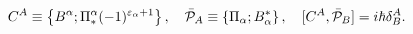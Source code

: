 \begin{equation}
C^{A}\equiv\left\{  B^{\alpha};\Pi_{\ast}^{\alpha}
(-1)^{\varepsilon_{\alpha}+1}\right\},\quad
\bar{{\cal P}}_{A}\equiv\left\{\Pi_{\alpha};B_{\alpha}^{\ast}\right\},\quad
[C^{A},\bar{{\cal P}}_{B}]=i\hbar\delta_{B}^{A}.\label{3.34}
\end{equation}

